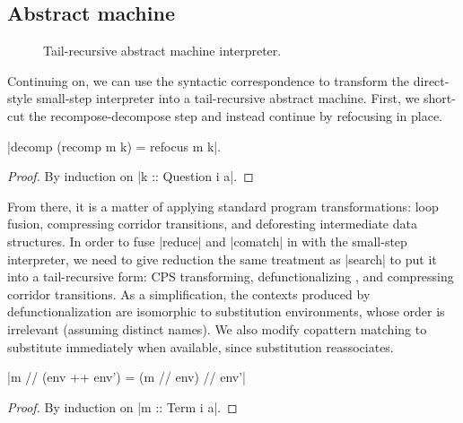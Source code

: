 \documentclass[sigplan,screen]{acmart}
\newcommand{\basicstylesize}{\small}
\begin{document}
\subsection{Abstract machine}

\begin{figure}
\centering
\renewcommand{\basicstylesize}{\footnotesize}
\caption{Tail-recursive abstract machine interpreter.}
\label{fig:block-machine-code}
\end{figure}

Continuing on, we can use the syntactic correspondence to transform the
direct-style small-step interpreter into a tail-recursive abstract machine.
First, we short-cut the recompose-decompose step and instead continue by
refocusing in place.
\begin{lemma}
  \label{thm:block-refocusing}

  \hs|decomp (recomp m k) = refocus m k|.
\end{lemma}
\begin{proof}
  By induction on \hs|k :: Question i a|.
\end{proof}
From there, it is a matter of applying standard program transformations: loop
fusion, compressing corridor transitions, and deforesting intermediate data
structures.  In order to fuse \hs|reduce| and \hs|comatch| in with the
small-step interpreter, we need to give reduction the same treatment as
\hs|search| to put it into a tail-recursive form: CPS transforming,
defunctionalizing \cite{DefinitionalInterpreters}, and compressing corridor
transitions.  As a simplification, the contexts produced by defunctionalization
are isomorphic to substitution environments, whose order is irrelevant (assuming
distinct names).  We also modify copattern matching to substitute immediately
when available, since substitution reassociates.
\begin{lemma}
  \label{thm:block-subst-reassoc}
  \hs|m // (env ++ env') = (m // env) // env'|
\end{lemma}
\begin{proof}
  By induction on \hs|m :: Term i a|.
\end{proof}
\end{document}
